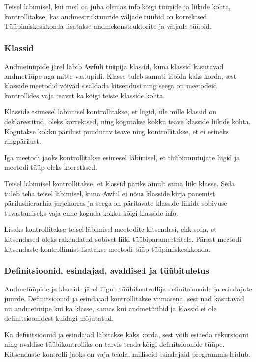 \documentclass[12pt]{article}
\begin{document}
        Teisel läbimisel, kui meil on juba olemas info kõigi tüüpide ja liikide kohta, kontrollitakse, kas andmestruktuuride väljade tüübid on korrektsed. Tüüpimiskeskkonda lisatakse andmekonstruktorite ja väljade tüübid.
      \subsubsection{Klassid}
        Andmetüüpide järel läbib Awfuli tüüpija klassid, kuna klassid kasutavad andmetüüpe aga mitte vastupidi. Klasse tuleb samuti läbida kaks korda, sest klasside meetodid võivad sisaldada kitsendusi ning seega on meetodeid kontrollides vaja teavet ka kõigi teiste klasside kohta.

        Klasside esimesel läbimisel kontrollitakse, et liigid, üle mille klassid on deklareeritud, oleks korrektsed, ning kogutakse kokku teave klasside liikide kohta. Kogutakse kokku pärilust puudutav teave ning kontrollitakse, et ei esineks ringpärilust.

        Iga meetodi jaoks kontrollitakse esimesel läbimisel, et tüübimuutujate liigid ja meetodi tüüp oleks korretksed.

        Teisel läbimisel kontrollitakse, et klassid päriks ainult sama liiki klasse. Seda tuleb teha teisel läbimisel, kuna Awful ei nõua klasside kirja panemist pärilushierarhia järjekorras ja seega on päritavate klasside liikide sobivuse tuvastamiseks vaja enne koguda kokku kõigi klasside info.

        Lisaks kontrollitakse teisel läbimisel meetodite kitsendusi, ehk seda, et kitsendused oleks rakendatud sobivat liiki tüübiparameetritele. Pärast meetodi kitsenduste kontrollimist lisatakse meetodi tüüp tüüpimiskeskkonda.
      \subsubsection{Definitsioonid, esindajad, avaldised ja tüübituletus}\label{deftyyp}
        Andmetüüpide ja klasside järel liigub tüübikontrollija definitsioonide ja esindajate juurde. Definitsioonid ja esindajad kontrollitakse viimasena, sest nad kasutavad nii andmetüüpe kui ka klasse, samas kui andmetüübid ja klassid ei ole definitsioonidest kuidagi mõjutatud.

        Ka definitsioonid ja esindajad läbitakse kaks korda, sest võib esineda rekursiooni ning avaldise tüübikontrolliks on tarvis teada kõigi definitsioonide tüüpe. Kitsenduste kontrolli jaoks on vaja teada, milliseid esindajaid programmis leidub.
\end{document}
